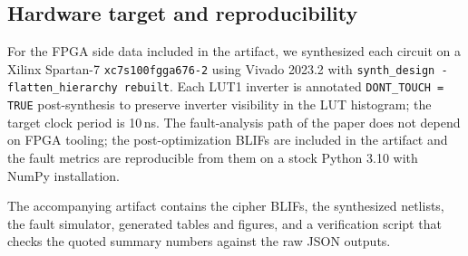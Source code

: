 \subsection{Hardware target and reproducibility}
\label{sec:methodology:fpga}

For the FPGA side data included in the artifact, we synthesized each
circuit on a Xilinx Spartan-7 \texttt{xc7s100fgga676-2}
using Vivado 2023.2 with \texttt{synth\_design -flatten\_hierarchy
rebuilt}. Each LUT1 inverter is annotated \texttt{DONT\_TOUCH = TRUE}
post-synthesis to preserve inverter visibility in the LUT histogram;
the target clock period is 10\,ns. The fault-analysis path of the
paper does not depend on FPGA tooling; the post-optimization BLIFs
are included in the artifact and the fault metrics are reproducible
from them on a stock Python 3.10 with NumPy installation.

The accompanying artifact contains the cipher BLIFs,
the synthesized netlists, the fault simulator, generated tables and
figures, and a verification script that checks the quoted summary numbers
against the raw JSON outputs.

